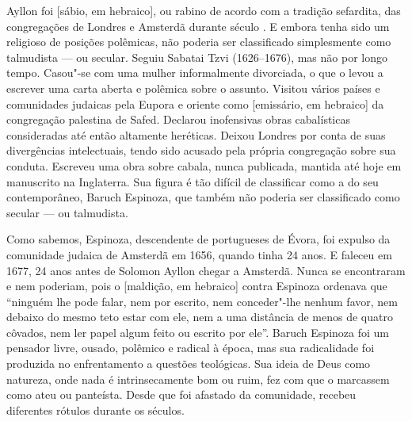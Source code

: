 \begin{changemargin}
\hspace{.5cm}
\vspace*{1cm}
\enlargethispage{-\baselineskip}


\bigskip

\hfill{}

\bigskip

Ayllon foi {} [sábio, em hebraico], ou rabino de acordo com a tradição sefardita, das congregações de Londres e Amsterdã durante século . E embora tenha sido um religioso de posições polêmicas, não poderia ser classificado simplesmente como talmudista --- ou secular. Seguiu Sabatai Tzvi (1626--1676), mas não por longo tempo. Casou"-se com uma mulher informalmente divorciada, o que o levou a escrever uma carta aberta e polêmica sobre o assunto. Visitou vários países e comunidades judaicas pela Eupora e oriente como {} [emissário, em hebraico] da congregação palestina de Safed. Declarou inofensivas obras cabalísticas consideradas até então altamente heréticas. Deixou Londres por conta de suas divergências intelectuais, tendo sido acusado pela própria congregação sobre sua conduta. Escreveu uma obra sobre cabala, nunca publicada, mantida até hoje em manuscrito na Inglaterra. Sua figura é tão difícil de classificar como a do seu contemporâneo, Baruch Espinoza, que também não poderia ser classificado como secular --- ou talmudista.

Como sabemos, Espinoza, descendente de portugueses de Évora, foi expulso da comunidade judaica de Amsterdã em 1656, quando tinha 24 anos. E faleceu em 1677, 24 anos antes de Solomon Ayllon chegar a Amsterdã. Nunca se encontraram e nem poderiam, pois o {} [maldição, em hebraico] contra Espinoza ordenava que ``ninguém lhe pode falar, nem por escrito, nem conceder"-lhe nenhum favor, nem debaixo do mesmo teto estar com ele, nem a uma distância de menos de quatro côvados, nem ler papel algum feito ou escrito por ele''. Baruch Espinoza foi um pensador livre, ousado, polêmico e radical à época, mas sua radicalidade foi produzida no enfrentamento a questões teológicas. Sua ideia de Deus como natureza, onde nada é intrinsecamente bom ou ruim, fez com que o marcassem como ateu ou panteísta. Desde que foi afastado da comunidade, recebeu diferentes rótulos durante os séculos. 


\end{changemargin}
